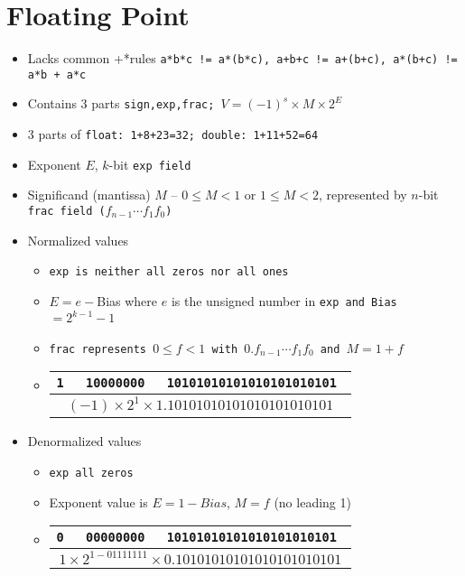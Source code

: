 \section{Floating Point}
\begin{itemize}[nosep]
    \item Lacks common +*rules \tt{a*b*c != a*(b*c),} \tt{a+b+c != a+(b+c),} \tt{a*(b+c) != a*b + a*c}
    \item Contains $3$ parts \tt{sign,exp,frac}; $V = (-1)^s \times M \times 2^E$
    \item 3 parts of \tt{float}: 1+8+23=32; \tt{double}: 1+11+52=64
    \item Exponent $E$, $k$-bit \tt{exp} field
    \item Significand (mantissa) $M$ -- $0\leq M<1$ or $1\leq M<2$, represented by $n$-bit \tt{frac} field ($f_{n - 1}\cdots f_1 f_0$)
    \item Normalized values
    \begin{itemize}[nosep]
        \item \tt{exp} is neither all zeros nor all ones
        \item $E = e - $Bias where $e$ is the unsigned number in \tt{exp} and Bias $= 2^{k - 1} - 1$
        \item \tt{frac} represents $0 \leq f < 1$ with $0.f_{n - 1}\cdots f_1 f_0$ and $M = 1 + f$
        \item 
            \begin{tabular}{|c|c|c|} \hline
            \tt{1} & \tt{10000000} & \tt{10101010101010101010101} \\ \hline
            \multicolumn{3}{|c|}{$(-1)\times 2^1\times 1.10101010101010101010101$}\\ \hline
            \end{tabular} 
    \end{itemize}
    \item Denormalized values
    \begin{itemize}[nosep]
        \item \tt{exp} all zeros
        \item Exponent value is $E = 1 - Bias$, $M = f$ (no leading 1)
        \item
            \begin{tabular}{|c|c|c|} \hline
            \tt{0} & \tt{00000000} & \tt{10101010101010101010101} \\ \hline
            \multicolumn{3}{|c|}{$1\times 2^{1-01111111}\times 0.10101010101010101010101$}\\ \hline

\end{tabular}
\end{itemize}
\end{itemize}

